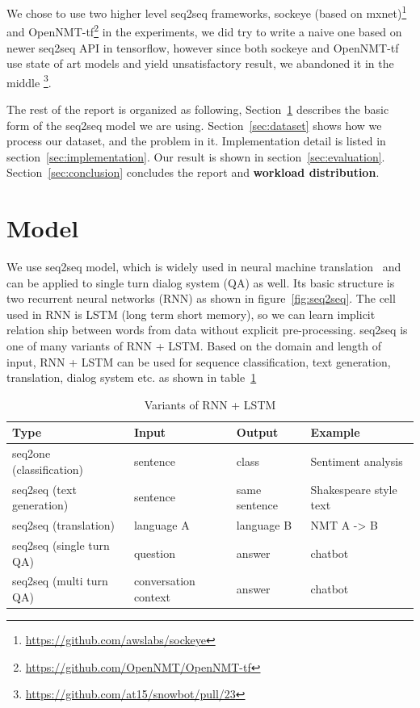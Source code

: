 \documentclass{article}
\begin{document}
We chose to use two higher level seq2seq frameworks, sockeye (based on mxnet)\footnote{\url{https://github.com/awslabs/sockeye}}
and OpenNMT-tf\footnote{\url{https://github.com/OpenNMT/OpenNMT-tf}} in the experiments,
we did try to write a naive one based on newer seq2seq API in tensorflow, however since both sockeye and OpenNMT-tf use state of art models
and yield unsatisfactory result, we abandoned it in the middle \footnote{\url{https://github.com/at15/snowbot/pull/23}}.

The rest of the report is organized as following, Section~\ref{sec:model} describes the basic form of the seq2seq model we are using.
Section~\ref{sec:dataset} shows how we process our dataset, and the problem in it.
Implementation detail is listed in section~\ref{sec:implementation}.
Our result is shown in section~\ref{sec:evaluation}.
Section~\ref{sec:conclusion} concludes the report and \textbf{workload distribution}.

\section{Model}
\label{sec:model}

We use seq2seq model, which is widely used in neural machine translation~\cite{sutskever2014sequence}
and can be applied to single turn dialog system (QA) as well.
Its basic structure is two recurrent neural networks (RNN) as shown in figure~\ref{fig:seq2seq}.
The cell used in RNN is LSTM (long term short memory),
so we can learn implicit relation ship between words from data without explicit pre-processing.
seq2seq is one of many variants of RNN + LSTM. Based on the domain and length of input,
RNN + LSTM can be used for sequence classification, text generation, translation, dialog system etc.
as shown in table~\ref{table:RNN+LSTM}

\begin{table}[h]
    \caption{Variants of RNN + LSTM}
    \label{table:RNN+LSTM}
    \centering
    \begin{tabular}{llll}
        \toprule
        Type & Input & Output & Example \\
        \midrule
        seq2one (classification) & sentence & class & Sentiment analysis \\
        seq2seq (text generation) & sentence & same sentence & Shakespeare style text \\
        seq2seq (translation) & language A & language B & NMT A -> B \\
        seq2seq (single turn QA) & question & answer & chatbot \\
        seq2seq (multi turn QA) & conversation context & answer & chatbot \\
        \bottomrule
    \end{tabular}
\end{table}
\end{document}
